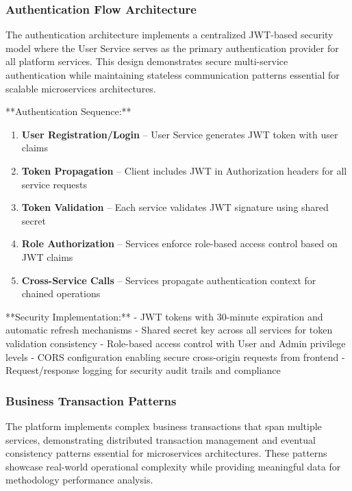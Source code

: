 \subsubsection{Authentication Flow Architecture}
The authentication architecture implements a centralized JWT-based security model where the User Service serves as the primary authentication provider for all platform services. This design demonstrates secure multi-service authentication while maintaining stateless communication patterns essential for scalable microservices architectures.

**Authentication Sequence:**
\begin{enumerate}
\item \textbf{User Registration/Login} -- User Service generates JWT token with user claims
\item \textbf{Token Propagation} -- Client includes JWT in Authorization headers for all service requests
\item \textbf{Token Validation} -- Each service validates JWT signature using shared secret
\item \textbf{Role Authorization} -- Services enforce role-based access control based on JWT claims
\item \textbf{Cross-Service Calls} -- Services propagate authentication context for chained operations
\end{enumerate}

**Security Implementation:**
- JWT tokens with 30-minute expiration and automatic refresh mechanisms
- Shared secret key across all services for token validation consistency
- Role-based access control with User and Admin privilege levels
- CORS configuration enabling secure cross-origin requests from frontend
- Request/response logging for security audit trails and compliance

\subsubsection{Business Transaction Patterns}
The platform implements complex business transactions that span multiple services, demonstrating distributed transaction management and eventual consistency patterns essential for microservices architectures. These patterns showcase real-world operational complexity while providing meaningful data for methodology performance analysis.

